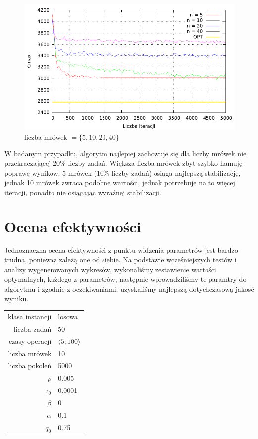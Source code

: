 \documentclass[10pt,a4paper]{article}
\begin{document}
\begin{figure}[h]
    \centering
    \includegraphics{./figures/inst_01_rnd_antno_smooth.pdf}
    \caption{liczba mrówek $= \{ 5, 10, 20, 40 \} $}
\end{figure}
\vspace{15mm}
W badanym przypadku, algorytm najlepiej zachowuje się dla liczby mrówek nie przekraczającej 20\% liczby zadań.
Większa liczba mrówek zbyt szybko hamuję poprawę wyników. 5 mrówek (10\% liczby zadań) osiąga najlepszą stabilizację, jednak 10 mrówek zwraca podobne wartości, jednak potrzebuje na to więcej iteracji, ponadto nie osiągając wyraźnej stabilizacji.

\newpage
\section{Ocena efektywności}
Jednoznaczna ocena efektywności z punktu widzenia parametrów jest bardzo trudna, ponieważ zależą one od siebie.
Na podstawie wcześniejszych testów i analizy wygenerowanych wykresów, wykonaliśmy zestawienie wartości optymalnych, każdego z parametrów, następnie wprowadziliśmy te paramtry do algorytmu i zgodnie z oczekiwaniami, uzyskaliśmy najlepszą dotychczasową jakosć wyniku.

\vspace{6 mm}
\begin{center}
\begin{tabular}{|r|l|}
  \hline
  klasa instancji & losowa \\
  liczba zadań & 50 \\
  czasy operacji & $ \langle 5;100 \rangle $  \\
  liczba mrówek & 10\\
  liczba pokoleń & 5000 \\
  $ \rho $ & 0.005 \\
  $ \tau_0 $ & 0.0001 \\
  $ \beta $ & 0 \\
  $ \alpha $ & 0.1 \\
  $ q_0 $ & 0.75 \\
  \hline
\end{tabular}
\end{center}
\end{document}
